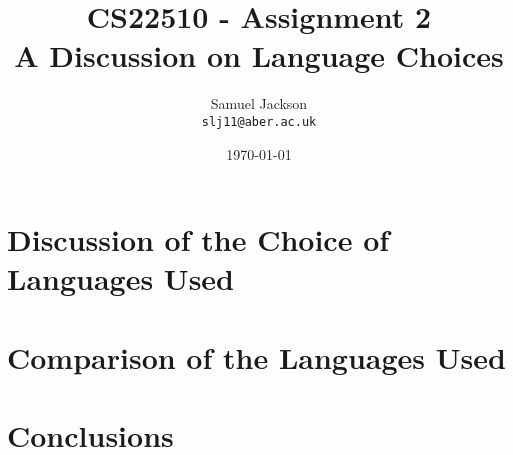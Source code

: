 \documentclass{article}
\begin{document}
\title{CS22510 - Assignment 2 \\ A Discussion on Language Choices}
\author{Samuel Jackson \\ \texttt{slj11@aber.ac.uk}}
\date{\today}
\maketitle

\section{Discussion of the Choice of Languages Used}

\section{Comparison of the Languages Used}

\section{Conclusions}
\end{document}
